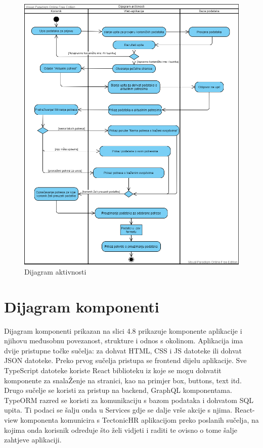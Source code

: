		\begin{figure}[H]
			\includegraphics[width=\textwidth]{slike/dijagram_aktivnosti.png}
			\caption{Dijagram aktivnosti}
			\label{fig:uml_db} 
		\end{figure}
		
			
			\eject
		\section{Dijagram komponenti}
Dijagram komponenti prikazan na slici 4.8 prikazuje komponente aplikacije i njihovu međusobnu povezanost, strukture i odnos s okolinom. Aplikacija ima dvije pristupne točke sučelja: za dohvat
HTML, CSS i JS datoteke ili dohvat JSON datoteke. Preko prvog sučelja pristupa se frontend dijelu
aplikacije. Sve TypeScript datoteke koriste React biblioteku iz koje se mogu dohvatit komponente za
snalaŽenje na stranici, kao na primjer box, buttons, text itd. Drugo sučelje se koristi za pristup na
backend, GraphQL komponentama. TypeORM razred se koristi za komunikaciju s bazom podataka i
dohvatom SQL upita. Ti podaci se šalju onda u Services gdje se dalje vrše akcije s njima. React-view
komponenta komunicira s TectonicHR aplikacijom preko poslanih sučelja, na kojima onda korisnik
odreduje što želi vidjeti i raditi te ovisno o tome šalje zahtjeve aplikaciji.

